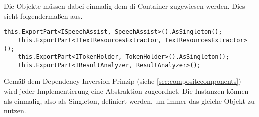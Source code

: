 Die Objekte müssen dabei einmalig dem \gls{di}-Container zugewiesen werden. Dies sieht folgendermaßen aus.

\begin{lstlisting}[caption=Dependency Injection, label=lst:depInj]
	this.ExportPart<ISpeechAssist, SpeechAssist>().AsSingleton();
	this.ExportPart<ITextResourcesExtractor, TextResourcesExtractor>();
	this.ExportPart<ITokenHolder, TokenHolder>().AsSingleton();
	this.ExportPart<IResultAnalyzer, ResultAnalyzer>();
\end{lstlisting}

Gemäß dem Dependency Inversion Prinzip (siehe \autoref{sec:compositecomponents}) wird jeder Implementierung eine Abstraktion zugeordnet. Die Instanzen können als einmalig, also als Singleton, definiert werden, um immer das gleiche Objekt zu nutzen. 